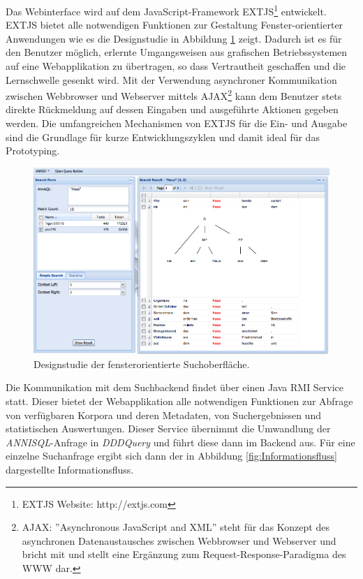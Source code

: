 Das Webinterface wird auf dem JavaScript-Framework EXTJS\footnote{EXTJS Website: http://extjs.com} entwickelt. EXTJS bietet alle notwendigen Funktionen zur Gestaltung Fenster-orientierter Anwendungen wie es die Designstudie in Abbildung \ref{fig:ANNIS2_Screenshot} zeigt. Dadurch ist es für den Benutzer möglich, erlernte Umgangsweisen aus grafischen Betriebssystemen auf eine Webapplikation zu übertragen, so dass Vertrautheit geschaffen und die Lernschwelle gesenkt wird. Mit der Verwendung asynchroner Kommunikation zwischen Webbrowser und Webserver mittels AJAX\footnote{AJAX: ''Asynchronous JavaScript and XML'' steht für das Konzept des asynchronen Datenaustausches zwischen Webbrowser und Webserver und bricht mit und stellt eine Ergänzung zum Request-Response-Paradigma des WWW dar.} kann dem Benutzer stets direkte Rückmeldung auf dessen Eingaben und ausgeführte Aktionen gegeben werden. Die umfangreichen Mechanismen von EXTJS für die Ein- und Ausgabe sind die Grundlage für kurze Entwicklungszyklen und damit ideal für das Prototyping.

\begin{figure}[H]
	\centering
	\includegraphics*[width=1.0\textwidth]{figures/ANNIS2_Screenshot}
	\caption{Designstudie der fensterorientierte Suchoberfläche.}
	\label{fig:ANNIS2_Screenshot}
\end{figure}

Die Kommunikation mit dem Suchbackend findet über einen Java RMI Service statt. Dieser bietet der Webapplikation alle notwendigen Funktionen zur Abfrage von verfügbaren Korpora und deren Metadaten, von Suchergebnissen und statistischen Auswertungen. Dieser Service übernimmt die Umwandlung der \emph{ANNISQL}-Anfrage in \emph{DDDQuery}  und führt diese dann im Backend aus. Für eine einzelne Suchanfrage ergibt sich dann der in Abbildung \ref{fig:Informationsfluss} dargestellte Informationsfluss.

